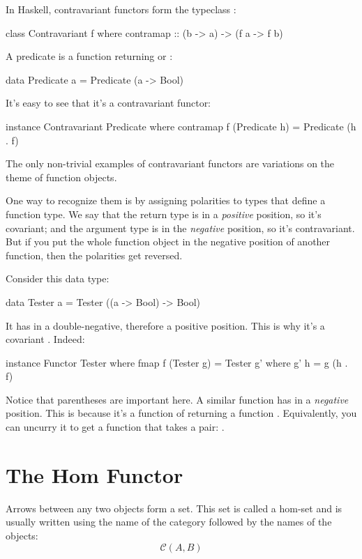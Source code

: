 \documentclass[DaoFP]{subfiles}
\begin{document}
In Haskell, contravariant functors form the typeclass :
\begin{haskell}
class Contravariant f where
  contramap :: (b -> a) -> (f a -> f b)
\end{haskell}

A predicate is a function returning  or :
\begin{haskell}
data Predicate a = Predicate (a -> Bool)
\end{haskell}
It's easy to see that it's a contravariant functor:
\begin{haskell}
instance Contravariant Predicate where
  contramap f (Predicate h) = Predicate (h . f)
\end{haskell}

The only non-trivial examples of contravariant functors are variations on the theme of function objects. 

One way to recognize them is by assigning polarities to types that define a function type. We say that the return type is in a \emph{positive} position, so it's covariant; and the argument type is in the \emph{negative} position, so it's contravariant. But if you put the whole function object in the negative position of another function, then the polarities get reversed. 

Consider this data type:
\begin{haskell}
data Tester a = Tester ((a -> Bool) -> Bool)
\end{haskell}
It has  in a double-negative, therefore a positive position. This is why it's a covariant . Indeed:

\begin{haskell}
instance Functor Tester where
  fmap f (Tester g) = Tester g'
    where g' h = g (h . f)
\end{haskell}

Notice that parentheses are important here. A similar function  has  in a \emph{negative} position. This is because it's a function of  returning a function . Equivalently, you can uncurry it to get a function that takes a pair: .

\section{The Hom Functor}

Arrows between any two objects form a set. This set is called a hom-set and is usually written using the name of the category followed by the names of the objects:
\[ \mathcal{C}(A, B) \]
\end{document}
